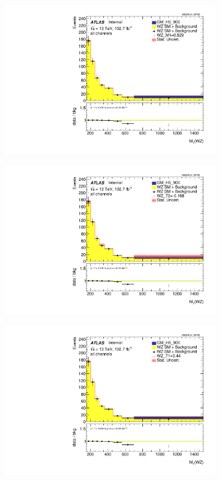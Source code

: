 \documentclass[../Bachelorarbeit.tex]{subfiles}
\begin{document}
\begin{figure}[h]
\begin{subfigure}{0.35\textwidth}
        \includegraphics[width=\textwidth]{Plots/ALL_MTWZ_right_color/GM_H5_900/M1/2022-05-07/VBSSR/all_VV_MTWZ.pdf}
    \end{subfigure}
    \begin{subfigure}{0.35\textwidth}
        \includegraphics[width=\textwidth]{Plots/ALL_MTWZ_right_color/GM_H5_900/T0/2022-05-07/VBSSR/all_VV_MTWZ.pdf}
    \end{subfigure}
    \begin{subfigure}{0.35\textwidth}
        \includegraphics[width=\textwidth]{Plots/ALL_MTWZ_right_color/GM_H5_900/T1/2022-05-07/VBSSR/all_VV_MTWZ.pdf}

\end{subfigure}
\end{figure}
\end{document}
